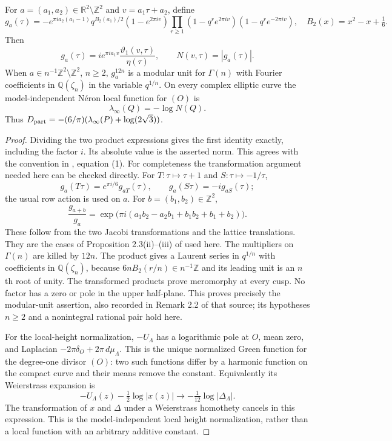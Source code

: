 \begin{proposition}\label{ari:C.4.1}
For $a=(a_1,a_2)\in\mathbb R^2\setminus\mathbb Z^2$ and
$v=a_1\tau+a_2$, define
\[
 g_a(\tau)=-e^{\pi ia_2(a_1-1)}q^{B_2(a_1)/2}
 (1-e^{2\pi iv})\prod_{r\ge1}
 (1-q^re^{2\pi iv})(1-q^re^{-2\pi iv}),
 \quad B_2(x)=x^2-x+\tfrac16.
\]
Then
\[
 g_a(\tau)=i e^{\pi ia_1v}
       \frac{\vartheta_1(v,\tau)}{\eta(\tau)},\qquad
 N(v,\tau)=|g_a(\tau)|.
\]
When $a\in n^{-1}\mathbb Z^2\setminus\mathbb Z^2$, $n\ge2$,
$g_a^{12n}$ is a modular unit for $\Gamma(n)$ with Fourier coefficients
in $\mathbb Q(\zeta_n)$ in the variable $q^{1/n}$. On every complex
elliptic curve the model-independent Néron local function for $(O)$ is
\[
 \lambda_\infty(Q)=-\log N(Q).
\]
Thus $D_{\rm part}=-(6/\pi)(\lambda_\infty(P)+\log(2\sqrt3))$.
\end{proposition}
\begin{proof}
Dividing the two product expressions gives the first identity exactly,
including the factor $i$. Its absolute value is the asserted norm.
This agrees with the convention in \cite{Shin2015}, equation (1).
For completeness the transformation argument needed here can be
checked directly. For $T:\tau\mapsto\tau+1$ and
$S:\tau\mapsto-1/\tau$,
\[
 g_a(T\tau)=e^{\pi i/6}g_{aT}(\tau),\qquad
 g_a(S\tau)=-i g_{aS}(\tau);
\]
the usual row action is used on $a$. For $b=(b_1,b_2)\in\mathbb Z^2$,
\[
 \frac{g_{a+b}}{g_a}
 =\exp\bigl(\pi i(a_1b_2-a_2b_1+b_1b_2+b_1+b_2)\bigr).
\]
These follow from the two Jacobi transformations and the lattice
translations. They are the cases of Proposition 2.3(ii)--(iii) of
\cite{Shin2015} used here. The multipliers on $\Gamma(n)$ are killed
by $12n$. The product gives a Laurent series in $q^{1/n}$ with
coefficients in $\mathbb Q(\zeta_n)$, because
$6nB_2(r/n)\in n^{-1}\mathbb Z$ and its leading unit is an $n$th
root of unity. The transformed products prove meromorphy at every
cusp. No factor has a zero or pole in the upper half-plane. This
proves precisely the modular-unit assertion, also recorded in
Remark 2.2 of that source; its hypotheses $n\ge2$ and a nonintegral
rational pair hold here.

For the local-height normalization, $-U_\Lambda$ has a logarithmic
pole at $O$, mean zero, and Laplacian
$-2\pi\delta_O+2\pi\,d\mu_\Lambda$. This is the unique normalized
Green function for the degree-one divisor $(O)$: two such functions
differ by a harmonic function on the compact curve and their means
remove the constant. Equivalently its Weierstrass expansion is
\[
 -U_\Lambda(z)-\tfrac12\log|x(z)|
             \longrightarrow-\tfrac1{12}\log|\Delta_\Lambda|.
\]
The transformation of $x$ and $\Delta$ under a Weierstrass homothety
cancels in this expression. This is the model-independent local
height normalization, rather than a local function with an arbitrary
additive constant.
\end{proof}

